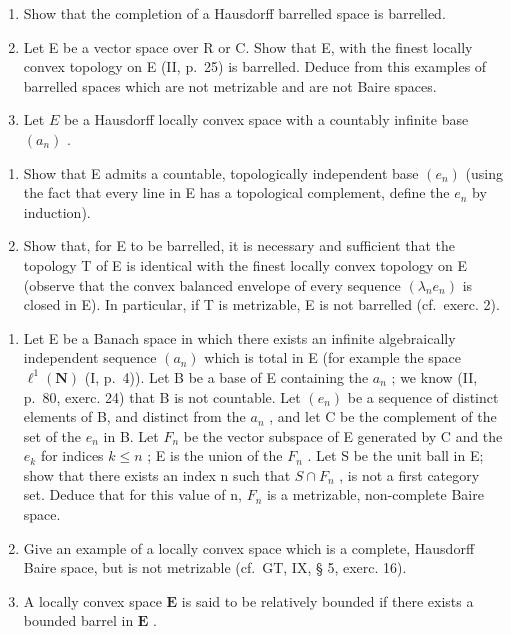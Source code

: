 \exercisegroup

\begin{enumerate}
\def\labelenumi{\arabic{enumi})}
\item
  Show that the completion of a Hausdorff barrelled space is barrelled.
\item
  Let E be a vector space over R or C. Show that E, with the finest locally convex topology on E (II, p.~25) is barrelled. Deduce from this examples of barrelled spaces which are not metrizable and are not Baire spaces.
\item
  Let \(E\) be a Hausdorff locally convex space with a countably infinite base \((a_{n})\) .
\end{enumerate}

\begin{enumerate}
\def\labelenumi{\alph{enumi})}
\item
  Show that E admits a countable, topologically independent base \((e_n)\) (using the fact that every line in E has a topological complement, define the \(e_n\) by induction).
\item
  Show that, for E to be barrelled, it is necessary and sufficient that the topology T of E is identical with the finest locally convex topology on E (observe that the convex balanced envelope of every sequence \((\lambda_{n}e_{n})\) is closed in E). In particular, if T is metrizable, E is not barrelled (cf.~exerc. 2).
\end{enumerate}

\begin{enumerate}
\def\labelenumi{\arabic{enumi})}
\setcounter{enumi}{3}
\item
  Let E be a Banach space in which there exists an infinite algebraically independent sequence \((a_{n})\) which is total in E (for example the space \(\ell^{1}(\mathbf{N})\) (I, p.~4)). Let B be a base of E containing the \(a_{n}\) ; we know (II, p.~80, exerc. 24) that B is not countable. Let \((e_{n})\) be a sequence of distinct elements of B, and distinct from the \(a_{n}\) , and let C be the complement of the set of the \(e_{n}\) in B. Let \(F_{n}\) be the vector subspace of E generated by C and the \(e_{k}\) for indices \(k \leqslant n\) ; E is the union of the \(F_{n}\) . Let S be the unit ball in E; show that there exists an index n such that \(S \cap F_{n}\) , is not a first category set. Deduce that for this value of n, \(F_{n}\) is a metrizable, non-complete Baire space.
\item
  Give an example of a locally convex space which is a complete, Hausdorff Baire space, but is not metrizable (cf.~GT, IX, § 5, exerc. 16).
\item
  A locally convex space \(\mathbf{E}\) is said to be relatively bounded if there exists a bounded barrel in \(\mathbf{E}\) .
\end{enumerate}

